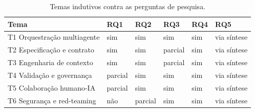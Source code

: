 \begin{table}[h!]
\centering
\caption{Temas indutivos contra as perguntas de pesquisa.}
\label{tab:tema-rq}
\small
\begin{tabularx}{\textwidth}{@{}p{3.5cm}YYYYY@{}}
\toprule
\textbf{Tema} & \textbf{RQ1} & \textbf{RQ2} & \textbf{RQ3} & \textbf{RQ4} & \textbf{RQ5} \\
\midrule
T1 Orquestração multiagente & sim & sim & sim & sim & via síntese \\
T2 Especificação e contrato & sim & sim & parcial & sim & via síntese \\
T3 Engenharia de contexto & sim & sim & parcial & sim & via síntese \\
T4 Validação e governança & parcial & sim & sim & sim & via síntese \\
T5 Colaboração humano-IA & parcial & sim & sim & sim & via síntese \\
T6 Segurança e red-teaming & não & parcial & sim & sim & via síntese \\
\bottomrule
\end{tabularx}
\end{table}
